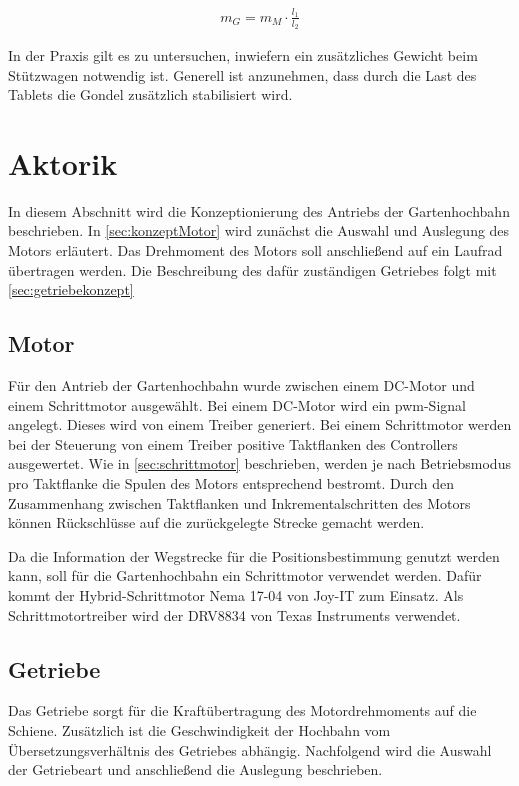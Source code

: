 \begin{align}
	m_G = m_M \cdot \frac{l_1}{l_2}
\end{align}
 
In der Praxis gilt es zu untersuchen, inwiefern ein zusätzliches Gewicht beim Stützwagen notwendig ist. Generell ist anzunehmen, dass durch die Last des Tablets die Gondel zusätzlich stabilisiert wird.  

\section{Aktorik}
\label{sec:konzeptAktorik}
In diesem Abschnitt wird die Konzeptionierung des Antriebs der Gartenhochbahn beschrieben. In \autoref{sec:konzeptMotor} wird zunächst die Auswahl und Auslegung des Motors erläutert. Das Drehmoment des Motors soll anschließend auf ein Laufrad übertragen werden. Die Beschreibung des dafür zuständigen Getriebes folgt mit \autoref{sec:getriebekonzept}

\subsection{Motor}
\label{sec:konzeptMotor}
Für den Antrieb der Gartenhochbahn wurde zwischen einem DC-Motor und einem Schrittmotor ausgewählt. Bei einem DC-Motor wird ein \acrshort{pwm}-Signal angelegt. Dieses wird von einem Treiber generiert. Bei einem Schrittmotor werden bei der Steuerung von einem Treiber positive Taktflanken des Controllers ausgewertet. Wie in \autoref{sec:schrittmotor} beschrieben, werden je nach Betriebsmodus pro Taktflanke die Spulen des Motors entsprechend bestromt. Durch den Zusammenhang zwischen Taktflanken und  Inkrementalschritten des Motors können Rückschlüsse auf die zurückgelegte Strecke gemacht werden.  

Da die Information der Wegstrecke für die Positionsbestimmung genutzt werden kann, soll für die Gartenhochbahn ein Schrittmotor verwendet werden. Dafür kommt der Hybrid-Schrittmotor Nema 17-04 von Joy-IT zum Einsatz. Als Schrittmotortreiber wird der DRV8834 von Texas Instruments verwendet. 


\subsection{Getriebe}
\label{sec:getriebekonzept}
Das Getriebe sorgt für die Kraftübertragung des Motordrehmoments auf die Schiene. Zusätzlich ist die Geschwindigkeit der Hochbahn vom Übersetzungsverhältnis des Getriebes abhängig. Nachfolgend wird die Auswahl der Getriebeart und anschließend die Auslegung beschrieben. \\

